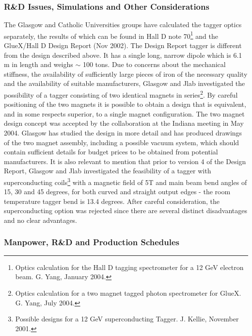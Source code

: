 \subsubsection*{R\&D Issues, Simulations and Other Considerations}
The Glasgow  and Catholic Universities groups have calculated the tagger
optics separately, the results of which can be found in Hall D
note 70\footnote{Optics calculation for the Hall D tagging spectrometer
for a 12 GeV electron beam. G. Yang, January 2004.} and the GlueX/Hall D
Design Report (Nov 2002). The Design Report tagger is different from
the design described above. It has a single long, narrow dipole which is
6.1 m in length and weighs $\sim$ 100 tons. Due to concerns about the
mechanical stiffness, the availability of sufficiently large pieces of
iron of the necessary quality and the availability of suitable
manufacturers, Glasgow  and Jlab investigated the possibility of a
tagger consisting of two identical magnets in series\footnote{Optics
calculation for a two magnet tagged photon spectrometer for GlueX.
G. Yang, July 2004.}.
By  careful positioning of the two magnets it is possible to obtain a
design that is equivalent, and in some respects superior, to a single
magnet configuration. The two magnet design concept was accepted by
the collaboration at the Indiana meeting in May 2004. Glasgow has studied
the design in more detail and has produced drawings of the two magnet
assembly, including a possible vacuum system, which should contain
sufficient details for budget prices to be obtained from potential
manufacturers.
It is also relevant to mention that prior to version 4 of the Design Report, 
Glasgow and Jlab investigated the feasibility of a tagger with superconducting 
coils\footnote{Possible designs for a 12 GeV superconducting Tagger. J. Kellie, 
November 2001.} with a magnetic field of 5T and main beam bend angles of 15, 30 
and 45 degrees, for both curved and straight output edges - the room temperature 
tagger bend is 13.4 degrees. After careful consideration, the superconducting 
option was rejected since there are several distinct disadvantages and no 
clear advantages.

\subsubsection*{Manpower, R\&D and Production Schedules}

